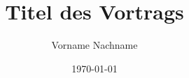 \newcommand{\N}{\mathbb{N}}
\newcommand{\Z}{\mathbb{Z}}
\newcommand{\Zp}{\Z_{\geq 0}}
\newcommand{\Q}{\mathbb{Q}}
\newcommand{\Qp}{\Q_{\geq 0}}
\newcommand{\R}{\mathbb{R}}
\newcommand{\Rp}{\R_{\geq 0}}
\newcommand{\Rmn}{\R^{m\times n}}
\newcommand{\eps}{\varepsilon}

\newcommand{\trennfolie}[1]{
\begin{frame}[plain]
\centering
\vfill
\Huge \textbf{#1}
\vfill
\end{frame}
}

\author{Vorname Nachname}
\title{Titel des Vortrags}
\date{\today}
